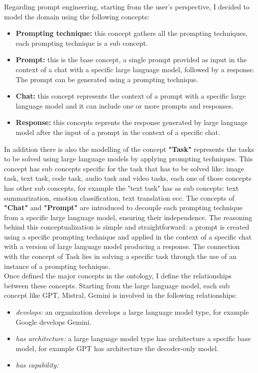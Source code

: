 Regarding prompt engineering, starting from the user's perspective, I decided to model the domain using the following concepts:
\begin{itemize}
    \item \textbf{Prompting technique:} this concept gathers all the prompting techniques, each prompting technique is a sub concept.

    \item \textbf{Prompt:} this is the base concept, a single prompt provided as input in the context of a chat with a specific large language model, followed by a response. The prompt can be generated using a prompting technique.

    \item \textbf{Chat:} this concept represents the context of a prompt with a specific large language model and it can include one or more prompts and responses.

    \item \textbf{Response:} this concepts reprents the response 
    generated by large language model after the input of a prompt in the context of a specific chat.
\end{itemize}
In addition there is also the modelling of the concept \textbf{"Task"} represents the tasks to be solved using large language models by applying prompting techniques. This concept has sub concepts specific for the task that has to be solved like: image task, text task, code task, audio task and video tasks, each one of those concepts has other sub concepts, for example the "text task" has as sub concepts: text summarization, emotion classification, text translation ecc. The concepts of \textbf{"Chat"} and \textbf{"Prompt"} are introduced to decouple each prompting technique from a specific large language model, ensuring their independence. The reasoning behind this conceptualization is simple and straightforward: a prompt is created using a specific prompting technique and applied in the context of a specific chat with a version of large language model producing a response. The connection with the concept of Task lies in solving a specific task through the use of an instance of a prompting technique.\\
Once defined the major concepts in the ontology, I define the relationships between these concepts. Starting from the large language model, each sub concept like GPT, Mistral, Gemini is involved in the following relationships:
\begin{itemize}
    \item \textit{develops:} an organization develops a large language model type, for example Google develops Gemini.

    \item \textit{has architecture:} a large language model type has architecture a specific base model, for example GPT has architecture the decoder-only model.

    \item \textit{has capability:}
\end{itemize}

